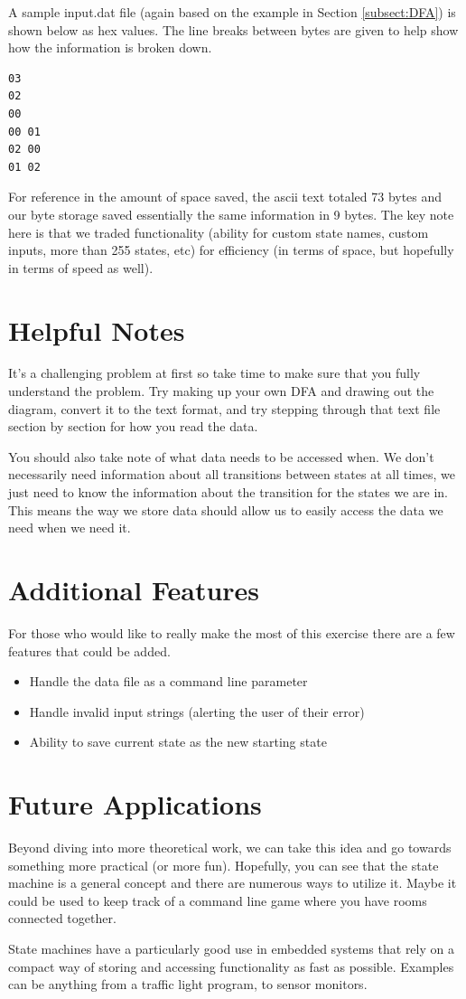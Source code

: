 \documentclass{article}
\begin{document}
A sample input.dat file (again based on the example in Section \ref{subsect:DFA}) is shown below as hex values. The line breaks between bytes are given to help show how the information is broken down.

\begin{verbatim}
03
02
00
00 01
02 00
01 02
\end{verbatim}

For reference in the amount of space saved, the ascii text totaled 73 bytes and our byte storage saved essentially the same information in 9 bytes. The key note here is that we traded functionality (ability for custom state names, custom inputs, more than 255 states, etc) for efficiency (in terms of space, but hopefully in terms of speed as well).

\section{Helpful Notes}
It's a challenging problem at first so take time to make sure that you fully understand the problem. Try making up your own DFA and drawing out the diagram, convert it to the text format, and try stepping through that text file section by section for how you read the data.

You should also take note of what data needs to be accessed when. We don't necessarily need information about all transitions between states at all times, we just need to know the information about the transition for the states we are in. This means the way we store data should allow us to easily access the data we need when we need it.

\section{Additional Features}
For those who would like to really make the most of this exercise there are a few features that could be added.

\begin{itemize}
\item Handle the data file as a command line parameter
\item Handle invalid input strings (alerting the user of their error)
\item Ability to save current state as the new starting state
\end{itemize}

\section{Future Applications}
Beyond diving into more theoretical work, we can take this idea and go towards something more practical (or more fun). Hopefully, you can see that the state machine is a general concept and there are numerous ways to utilize it. Maybe it could be used to keep track of a command line game where you have rooms connected together. 

State machines have a particularly good use in embedded systems that rely on a compact way of storing and accessing functionality as fast as possible. Examples can be anything from a traffic light program, to sensor monitors.
\end{document}
